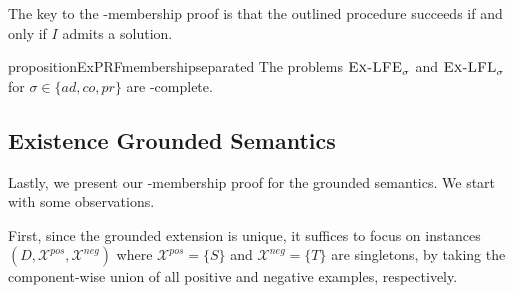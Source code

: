 \documentclass[letterpaper]{article} %
\newcommand{\adm}{\textit{ad}}
\newcommand{\com}{\textit{co}}
\newcommand{\prf}{\textit{pr}}
\newcommand{\grd}{\textit{gr}}
\newcommand{\ExLFE}[2]{\textsc{Ex-LFE}_{#1}^{#2}}
\newcommand{\ExLFL}[2]{\textsc{Ex-LFL}_{#1}^{#2}}
\newcommand{\Xpos}{\mathcal{X}^{pos}}
\newcommand{\Xneg}{\mathcal{X}^{neg}}
\newtheorem{observation}[example]{Observation}
\begin{document}
The key to the \NP-membership proof is that the outlined procedure succeeds if and only if $I$ admits a solution.
\begin{restatable}{proposition}{ExPRFmembershipseparated}
    The problems $\ExLFE{\sigma}{}$ and $\ExLFL{\sigma}{}$ for $\sigma\in \{\adm,\com,\prf\}$ are \NP-complete.
\end{restatable}

\subsection{Existence Grounded Semantics}\label{sec:grounded}
Lastly, we present our \NP-membership proof for the grounded semantics.
We start with some observations. 

First, since the grounded extension is unique,
it suffices to focus on instances $(D,\Xpos,\Xneg)$ where $\Xpos=\{S\}$ and $\Xneg=\{T\}$ are singletons, by taking the component-wise union of all positive and negative examples, respectively. 
\end{document}
